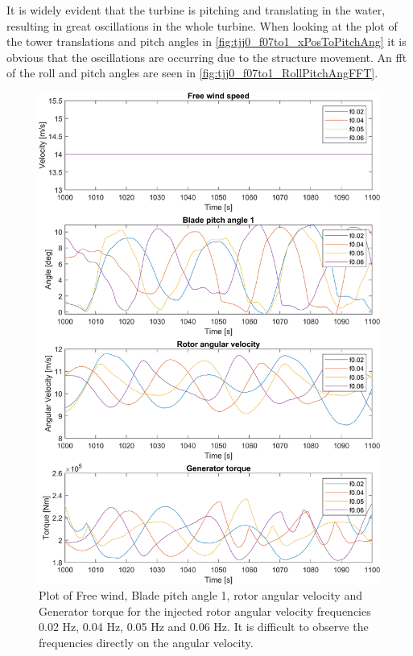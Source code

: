 It is widely evident that the turbine is pitching and translating in the water, resulting in great oscillations in the whole turbine. When looking at the plot of the tower translations and pitch angles in \cref{fig:tjj0_f07to1_xPosToPitchAng} it is obvious that the oscillations are occurring due to the structure movement. An fft of the roll and pitch angles are seen in \cref{fig:tjj0_f07to1_RollPitchAngFFT}.
\begin{figure}[ht]
	\centering
	\includegraphics[width=0.8\linewidth]{Graphics/TestResults/tj00/tjj0_f02to06VfreeToMgen.png}
	\caption{Plot of Free wind, Blade pitch angle 1, rotor angular velocity and Generator torque for the injected rotor angular velocity frequencies 0.02 Hz, 0.04 Hz, 0.05 Hz and 0.06 Hz. It is difficult to observe the frequencies directly on the angular velocity.}
	\label{fig:tjj0_f02to06VfreeToMgen}
\end{figure}

